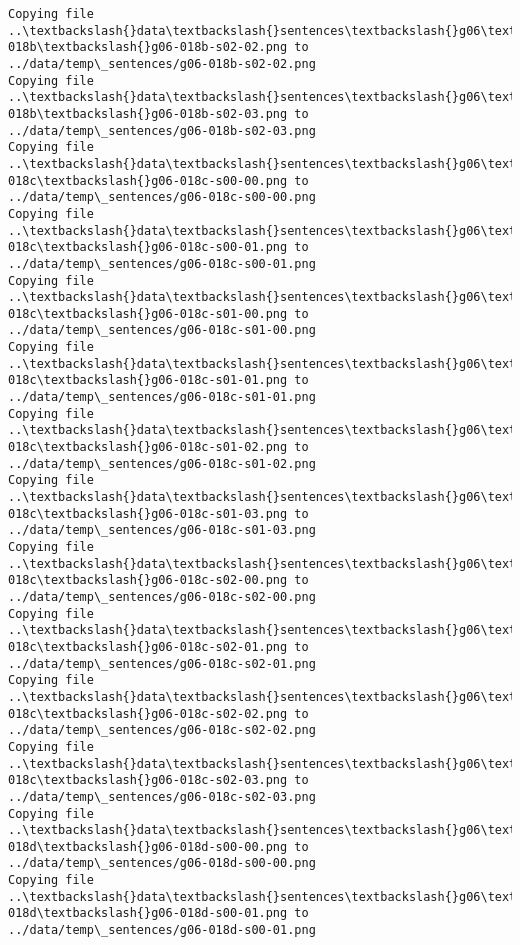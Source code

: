 \documentclass[11pt]{article}
\begin{document}
\begin{Verbatim}[commandchars=\\\{\}]
Copying file ..\textbackslash{}data\textbackslash{}sentences\textbackslash{}g06\textbackslash{}g06-018b\textbackslash{}g06-018b-s02-02.png to
../data/temp\_sentences/g06-018b-s02-02.png
Copying file ..\textbackslash{}data\textbackslash{}sentences\textbackslash{}g06\textbackslash{}g06-018b\textbackslash{}g06-018b-s02-03.png to
../data/temp\_sentences/g06-018b-s02-03.png
Copying file ..\textbackslash{}data\textbackslash{}sentences\textbackslash{}g06\textbackslash{}g06-018c\textbackslash{}g06-018c-s00-00.png to
../data/temp\_sentences/g06-018c-s00-00.png
Copying file ..\textbackslash{}data\textbackslash{}sentences\textbackslash{}g06\textbackslash{}g06-018c\textbackslash{}g06-018c-s00-01.png to
../data/temp\_sentences/g06-018c-s00-01.png
Copying file ..\textbackslash{}data\textbackslash{}sentences\textbackslash{}g06\textbackslash{}g06-018c\textbackslash{}g06-018c-s01-00.png to
../data/temp\_sentences/g06-018c-s01-00.png
Copying file ..\textbackslash{}data\textbackslash{}sentences\textbackslash{}g06\textbackslash{}g06-018c\textbackslash{}g06-018c-s01-01.png to
../data/temp\_sentences/g06-018c-s01-01.png
Copying file ..\textbackslash{}data\textbackslash{}sentences\textbackslash{}g06\textbackslash{}g06-018c\textbackslash{}g06-018c-s01-02.png to
../data/temp\_sentences/g06-018c-s01-02.png
Copying file ..\textbackslash{}data\textbackslash{}sentences\textbackslash{}g06\textbackslash{}g06-018c\textbackslash{}g06-018c-s01-03.png to
../data/temp\_sentences/g06-018c-s01-03.png
Copying file ..\textbackslash{}data\textbackslash{}sentences\textbackslash{}g06\textbackslash{}g06-018c\textbackslash{}g06-018c-s02-00.png to
../data/temp\_sentences/g06-018c-s02-00.png
Copying file ..\textbackslash{}data\textbackslash{}sentences\textbackslash{}g06\textbackslash{}g06-018c\textbackslash{}g06-018c-s02-01.png to
../data/temp\_sentences/g06-018c-s02-01.png
Copying file ..\textbackslash{}data\textbackslash{}sentences\textbackslash{}g06\textbackslash{}g06-018c\textbackslash{}g06-018c-s02-02.png to
../data/temp\_sentences/g06-018c-s02-02.png
Copying file ..\textbackslash{}data\textbackslash{}sentences\textbackslash{}g06\textbackslash{}g06-018c\textbackslash{}g06-018c-s02-03.png to
../data/temp\_sentences/g06-018c-s02-03.png
Copying file ..\textbackslash{}data\textbackslash{}sentences\textbackslash{}g06\textbackslash{}g06-018d\textbackslash{}g06-018d-s00-00.png to
../data/temp\_sentences/g06-018d-s00-00.png
Copying file ..\textbackslash{}data\textbackslash{}sentences\textbackslash{}g06\textbackslash{}g06-018d\textbackslash{}g06-018d-s00-01.png to
../data/temp\_sentences/g06-018d-s00-01.png

\end{Verbatim}
\end{document}
